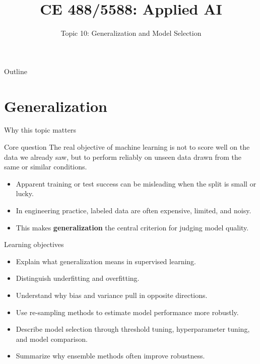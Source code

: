 \documentclass[12pt]{beamer}
\title{CE 488/5588: Applied AI}
\subtitle{Topic 10: Generalization and Model Selection}
\author{}
\date{}
\begin{document}
\begin{frame}
  \titlepage
\end{frame}

\begin{frame}{Outline}
  \tableofcontents
\end{frame}

\section{Generalization}

\begin{frame}{Why this topic matters}
  \begin{conceptbox}{Core question}
    The real objective of machine learning is not to score well on the data we already saw,
    but to perform reliably on unseen data drawn from the same or similar conditions.
  \end{conceptbox}
  \begin{itemize}
    \item Apparent training or test success can be misleading when the split is small or lucky.
    \item In engineering practice, labeled data are often expensive, limited, and noisy.
    \item This makes \textbf{generalization} the central criterion for judging model quality.
  \end{itemize}
\end{frame}

\begin{frame}{Learning objectives}
  \begin{itemize}
    \item Explain what generalization means in supervised learning.
    \item Distinguish underfitting and overfitting.
    \item Understand why bias and variance pull in opposite directions.
    \item Use re-sampling methods to estimate model performance more robustly.
    \item Describe model selection through threshold tuning, hyperparameter tuning, and model comparison.
    \item Summarize why ensemble methods often improve robustness.
  \end{itemize}
\end{frame}
\end{document}
